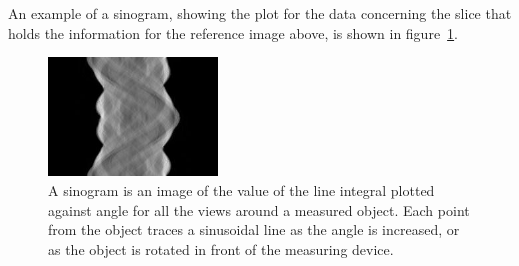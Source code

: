         An example of a sinogram, showing the plot for the data concerning the slice that holds the information for the reference image above, is shown in figure~\ref{fig:example_sinogram}.
        \begin{figure}[ht]
            \begin{center}
                \includegraphics[width=0.4\textwidth]{Files/report_images/example_sinograph.jpg}
            \end{center}
            \caption{A sinogram is an image of the value of the line integral plotted against angle for all the views around a measured object. Each point from the object traces a sinusoidal line as the angle is increased, or as the object is rotated in front of the measuring device.\label{fig:example_sinogram}}
        \end{figure}



